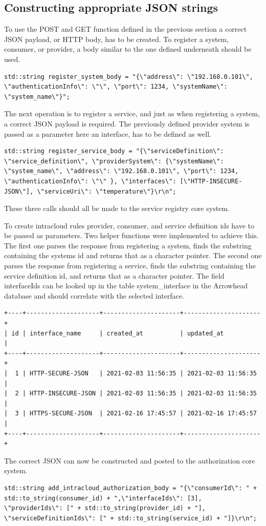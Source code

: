 \subsection{Constructing appropriate JSON strings}
To use the POST and GET function defined in the previous section a correct JSON payload, or HTTP body, has to be created.
To register a system, consumer, or provider, a body similar to the one defined underneath should be used.
\begin{lstlisting}[style=CStyle]
    std::string register_system_body = "{\"address\": \"192.168.0.101\", \"authenticationInfo\": \"\", \"port\": 1234, \"systemName\": \"system_name\"}";
\end{lstlisting}

The next operation is to register a service, and just as when registering a system, a correct JSON payload is required.
The previously defined provider system is passed as a parameter here an interface, has to be defined as well.
\begin{lstlisting}[style=CStyle]
    std::string register_service_body = "{\"serviceDefinition\": \"service_definition\", \"providerSystem\": {\"systemName\": \"system_name\", \"address\": \"192.168.0.101\", \"port\": 1234, \"authenticationInfo\": \"\" }, \"interfaces\": [\"HTTP-INSECURE-JSON\"], \"serviceUri\": \"temperature\"}\r\n";
\end{lstlisting}
These three calls should all be made to the service registry core system.

To create intracloud rules provider, consumer, and service definition ids have to be passed as parameters.
Two helper functions were implemented to achieve this.
The first one parses the response from registering a system, finds the substring containing the systems id and returns that as a character pointer.
The second one parses the response from registering a service, finds the substring containing the service definition id, and returns that as a character pointer.
The field interfaceIds can be looked up in the table system\_interface in the Arrowhead database and should correlate with the selected interface.
\begin{lstlisting}[style=SQLstyle]
+----+--------------------+---------------------+---------------------+
| id | interface_name     | created_at          | updated_at          |
+----+--------------------+---------------------+---------------------+
|  1 | HTTP-SECURE-JSON   | 2021-02-03 11:56:35 | 2021-02-03 11:56:35 |
|  2 | HTTP-INSECURE-JSON | 2021-02-03 11:56:35 | 2021-02-03 11:56:35 |
|  3 | HTTPS-SECURE-JSON  | 2021-02-16 17:45:57 | 2021-02-16 17:45:57 |
+----+--------------------+---------------------+---------------------+
\end{lstlisting}
The correct JSON can now be constructed and posted to the authorization core system.
\begin{lstlisting}[style=CStyle]
    std::string add_intracloud_authorization_body = "{\"consumerId\": " + std::to_string(consumer_id) + ",\"interfaceIds\": [3], \"providerIds\": [" + std::to_string(provider_id) + "], \"serviceDefinitionIds\": [" + std::to_string(service_id) + "]}\r\n";
\end{lstlisting}

